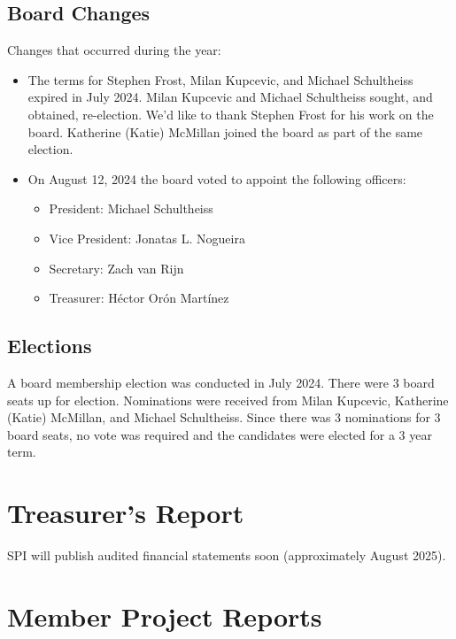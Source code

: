 \documentclass[a4paper]{report}
\begin{document}
\section{Board Changes}

Changes that occurred during the year:

\begin{itemize}

\item The terms for Stephen Frost, Milan Kupcevic, and Michael Schultheiss expired in July 2024.  Milan Kupcevic and Michael Schultheiss sought, and obtained, re-election.  We'd like to thank Stephen Frost for his work on the board.  Katherine (Katie) McMillan joined the board as part of the same election.

\item On August 12, 2024 the board voted to appoint the following officers:

\begin{itemize}
\item President: Michael Schultheiss
\item Vice President: Jonatas L. Nogueira
\item Secretary: Zach van Rijn
\item Treasurer: Héctor Orón Martínez
\end{itemize}

\end{itemize}

\section{Elections}

A board membership election was conducted in July 2024.  There were 3 board seats up for election.  Nominations were received from Milan Kupcevic, Katherine (Katie) McMillan, and Michael Schultheiss.  Since there was 3 nominations for 3 board seats, no vote was required and the candidates were elected for a 3 year term.

\chapter{Treasurer's Report}

SPI will publish audited financial statements soon (approximately August 2025).

\chapter{Member Project Reports}
\end{document}
